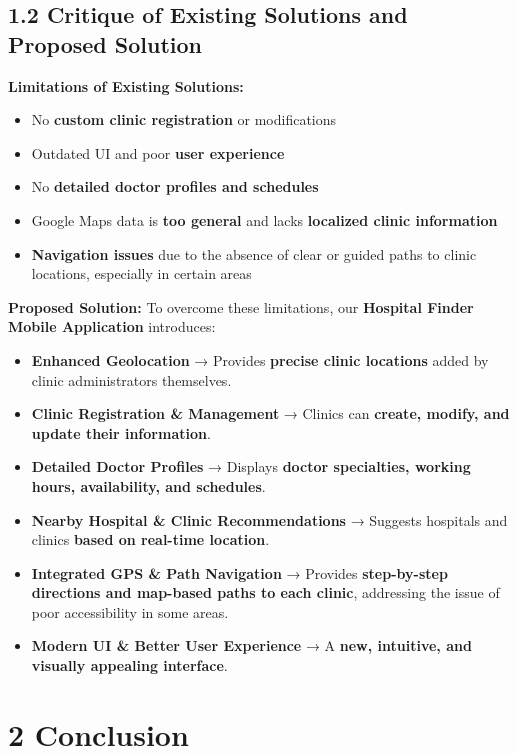 \documentclass[12pt]{report}
\begin{document}
\subsection*{\textbf{1.2 Critique of Existing Solutions and Proposed Solution}}
\textbf{Limitations of Existing Solutions:}
\begin{itemize}
	\item No \textbf{custom clinic registration} or modifications
	\item Outdated UI and poor \textbf{user experience}
	\item No \textbf{detailed doctor profiles and schedules}
	\item Google Maps data is \textbf{too general} and lacks \textbf{localized clinic information}
	\item \textbf{Navigation issues} due to the absence of clear or guided paths to clinic locations, especially in certain areas
\end{itemize}

\noindent \textbf{Proposed Solution:}
To overcome these limitations, our \textbf{Hospital Finder Mobile Application} introduces:
\begin{itemize}
	\item \textbf{Enhanced Geolocation} → Provides \textbf{precise clinic locations} added by clinic administrators themselves.
	\item \textbf{Clinic Registration \& Management} → Clinics can \textbf{create, modify, and update their information}.
	\item \textbf{Detailed Doctor Profiles} → Displays \textbf{doctor specialties, working hours, availability, and schedules}.
	\item \textbf{Nearby Hospital \& Clinic Recommendations} → Suggests hospitals and clinics \textbf{based on real-time location}.
	\item \textbf{Integrated GPS \& Path Navigation} → Provides \textbf{step-by-step directions and map-based paths to each clinic}, addressing the issue of poor accessibility in some areas.
	\item \textbf{Modern UI \& Better User Experience} → A \textbf{new, intuitive, and visually appealing interface}.
\end{itemize}

\section*{\textbf{2 Conclusion}}
\end{document}
